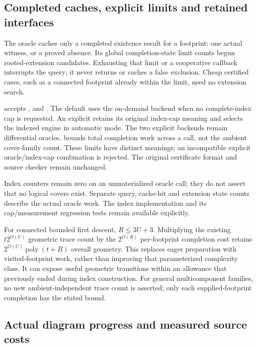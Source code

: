 \subsection{Completed caches, explicit limits and retained interfaces}

The oracle caches only a completed existence result for a footprint:
one actual witness, or a proved absence. Its global completion-state limit
counts begun rooted-extension candidates. Exhausting that limit or a
cooperative callback interrupts the query; it never returns or caches a
false exclusion. Cheap certified cases, such as a connected footprint
already within the limit, need no extension search.

 accepts ,  and .
The default uses the on-demand backend when no complete-index cap is
requested. An explicit  retains its original index-cap
meaning and selects the indexed engine in automatic mode. The two explicit
backends remain differential oracles.  bounds total
completion work across a call, not the ambient cover-family count. These
limits have distinct meanings; an incompatible explicit oracle/index-cap
combination is rejected. The original certificate format and source checker
remain unchanged.

Index counters remain zero on an unmaterialized oracle call; they do not
assert that no logical covers exist. Separate query, cache-hit and extension
state counts describe the actual oracle work. The index implementation and
its cap/measurement regression tests remain available explicitly.

For connected bounded first descent, $R\le3U+3$. Multiplying the existing
$t2^{O(U)}$ geometric trace count by the $2^{O(R)}$ per-footprint completion
cost retains $2^{O(U)}\operatorname{poly}(t+B)$ overall geometry. This replaces
eager preparation with visited-footprint work, rather than improving that
parameterized complexity class. It can expose useful geometric transitions
within an allowance that previously ended during index construction.
For general multicomponent families, no new ambient-independent trace count
is asserted; only each supplied-footprint completion has the stated bound.

\subsection{Actual diagram progress and measured source costs}

